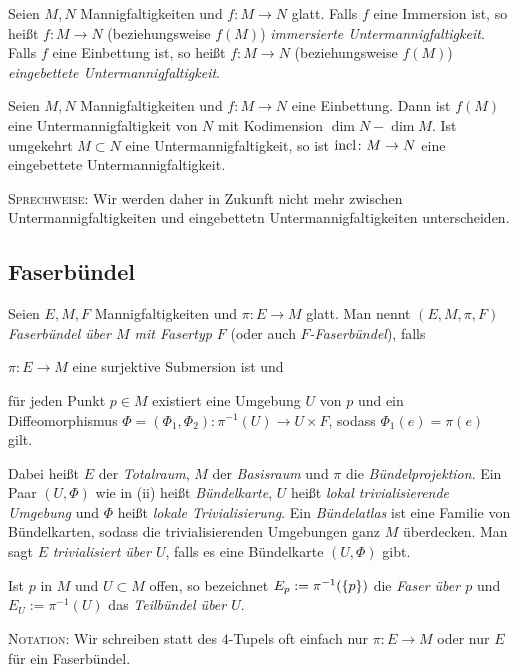 \begin{definition}
  Seien $M,N$ Mannigfaltigkeiten und $f\colon M \to N$ glatt. Falls
  $f$ eine Immersion ist, so heißt $f\colon M\to N$ (beziehungsweise
  $f(M)$) \emph{immersierte Untermannigfaltigkeit}. Falls $f$ eine
  Einbettung ist, so heißt $f\colon M \to N$ (beziehungsweise $f(M)$)
  \emph{eingebettete Untermannigfaltigkeit}.
\end{definition}

\begin{proposition}
  Seien $M,N$ Mannigfaltigkeiten und $f\colon M\to N$ eine Einbettung. Dann ist
  $f(M)$ eine Untermannigfaltigkeit von $N$ mit Kodimension $\dim N -
  \dim M$. Ist umgekehrt $M\subset N$ eine Untermannigfaltigkeit, so
  ist $\operatorname{incl}\colon M \to N$ eine eingebettete Untermannigfaltigkeit.

  \textsc{Sprechweise:} Wir werden daher in Zukunft nicht mehr
  zwischen Untermannigfaltigkeiten und eingebettetn
  Untermannigfaltigkeiten unterscheiden.
\end{proposition}

\subsection{Faserbündel}
\label{sec:faserbl}

\begin{definition}
  Seien $E,M,F$ Mannigfaltigkeiten und $\pi\colon E \to M$ glatt. Man
  nennt $(E,M,\pi,F)$ \emph{Faserbündel über $M$ mit Fasertyp $F$} (oder auch \emph{$F$-Faserbündel}), falls
  \begin{properties}
  \item $\pi\colon E \to M$ eine surjektive Submersion ist und
  \item für jeden Punkt $p\in M$ existiert eine Umgebung $U$ von $p$
    und ein Diffeomorphismus $\Phi = (\Phi_1,\Phi_2) \colon \pi^{-1}(U) \to U\times F$,
    sodass $\Phi_1(e) = \pi(e)$ gilt.
  \end{properties}
  Dabei heißt $E$ der \emph{Totalraum}, $M$ der \emph{Basisraum} und
  $\pi$ die \emph{Bündelprojektion}. Ein Paar $(U,\Phi)$ wie in (ii)
  heißt \emph{Bündelkarte}, $U$ heißt \emph{lokal trivialisierende
    Umgebung} und $\Phi$ heißt \emph{lokale Trivialisierung}. Ein
  \emph{Bündelatlas} ist eine Familie von Bündelkarten, sodass die
  trivialisierenden Umgebungen ganz $M$ überdecken. Man sagt $E$
  \emph{trivialisiert über $U$}, falls es eine Bündelkarte $(U,\Phi)$ gibt.

  Ist $p$ in $M$ und $U\subset M$ offen, so bezeichnet $E_p :=
  \pi^{-1}(\left\lbrace p \right\rbrace)$ die \emph{Faser über  $p$} und $E_U :=
  \pi^{-1}(U)$ das \emph{Teilbündel über $U$}.

  \textsc{Notation:} Wir schreiben statt des $4$-Tupels oft einfach
  nur $\pi\colon E\to M$ oder nur $E$ für ein Faserbündel.
\end{definition}

